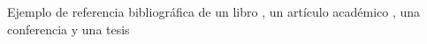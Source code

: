 Ejemplo de referencia bibliográfica de un libro \cite{libro_autor_apellido}, un artículo académico \cite{articulo_autor_apellido}, una conferencia \cite{conferencia_autor_apellido} y una tesis \cite{paper_autor_apellido}
